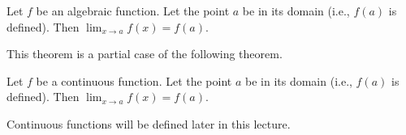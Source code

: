 \begin{frame}
\begin{theorem}
Let $f$ be an algebraic function. Let the point $a$ be in its domain (i.e., $f(a)$ is defined). Then $\displaystyle \lim_{x\to a}f(x) = f(a)$.
\end{theorem}
\pause
This theorem is a partial case of the following theorem.
\begin{theorem}
Let $f$ be a \alert<3>{continuous function}. Let the point $a$ be in its domain (i.e., $f(a)$ is defined). Then $\displaystyle \lim_{x\to a}f(x) = f(a)$.
\end{theorem}
\pause
\alert<3>{Continuous functions} will be defined later in this lecture.

\end{frame}
